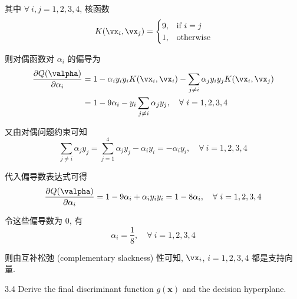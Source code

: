 \documentclass[openany]{ctexbook}
\theoremstyle{kaiti}
\theoremstyle{normal}
\begin{document}
其中 $\forall~i,j=1,2,3,4$, 核函数
\begin{equation}
  K(\vx_i,\vx_j)=
  \begin{cases}
    9,&\text{if}~i=j\\
    1,&\text{otherwise}
  \end{cases}
\end{equation}

则对偶函数对 $\alpha_i$ 的偏导为
\begin{equation}
  \begin{aligned}
    \frac{\partial Q(\valpha)}{\partial\alpha_i}
    &=1-\alpha_iy_iy_iK(\vx_i,\vx_i)-\sum_{j\neq i}\alpha_jy_iy_jK(\vx_i,\vx_j)\\
    &=1-9\alpha_i-y_i\sum_{j\neq i}\alpha_jy_j,\quad\forall~i=1,2,3,4
  \end{aligned}
\end{equation}

又由对偶问题约束可知
\begin{equation}
  \sum_{j\neq i}\alpha_jy_j=\sum_{j=1}^4\alpha_jy_j-\alpha_iy_i=-\alpha_iy_i,\quad\forall~i=1,2,3,4
\end{equation}

代入偏导数表达式可得
\begin{equation}
  \frac{\partial Q(\valpha)}{\partial\alpha_i}
  =1-9\alpha_i+\alpha_iy_iy_i=1-8\alpha_i,\quad\forall~i=1,2,3,4
\end{equation}

令这些偏导数为 0, 有
\begin{equation}
  \alpha_i=\frac{1}{8},\quad\forall~i=1,2,3,4
\end{equation}

则由互补松弛 (complementary slackness) 性可知, $\vx_i$, $i=1,2,3,4$ 都是支持向量.

3.4 Derive the final discriminant function $g(\bm{x})$ and the decision hyperplane.
\end{document}
